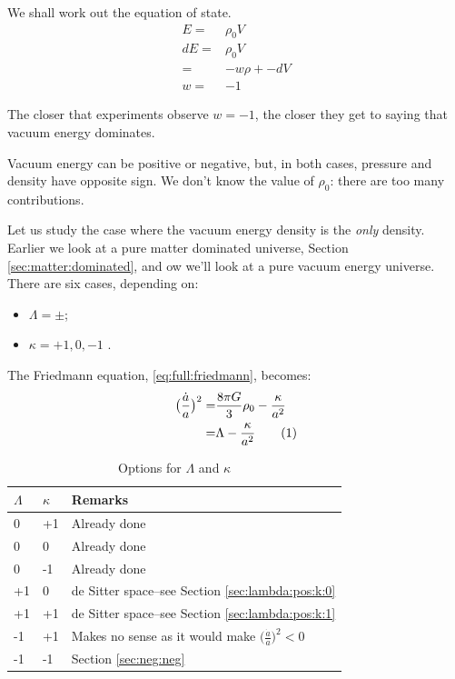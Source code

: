 \documentclass[]{article}
\newcommand\numberthis{\addtocounter{equation}{1}\tag{\theequation}}
\begin{document}
We shall work out the equation of state.
\begin{align*}
	E =& \rho_0V\\
	dE =& \rho_0 V \\
	=&-w \rho+- dV\\
	w=&-1
\end{align*}

The closer that experiments observe $w=-1$, the closer they get to saying that vacuum energy dominates.

Vacuum energy can be positive or negative, but, in both cases, pressure and density have opposite sign. We don't know the value of $\rho_0$: there are too many contributions.

Let us study the case where the vacuum energy density is the \emph{only} density. Earlier we look at a pure matter dominated universe, Section \ref{sec:matter:dominated}, and ow we'll look at a pure vacuum energy universe. There are six cases, depending on:
\begin{itemize}
	\item $\Lambda=\pm$;
	\item $\kappa= +1, 0, -1$ .
\end{itemize}

The Friedmann equation, \eqref{eq:full:friedmann}, becomes:
\begin{align*}
	\big(\frac{\dot{a}}{a}\big)^2  =& \frac{8\pi G}{3} \rho_0 - \frac{\kappa}{a^2}\\
	=& \Lambda - \frac{\kappa}{a^2} \numberthis \label{eq:friedmann:avec:lambda}
\end{align*}

\begin{table}[H]
	\begin{center}
		\caption{Options for $\Lambda$ and $\kappa$}
		\begin{tabular}{||l|l|p{5cm}||} \hline
			$\Lambda$ & $\kappa$ & Remarks\\ \hline
			0 & +1 & Already done\\\hline
			0 & 0 & Already done\\\hline
			0 & -1 & Already done\\\hline
			+1 & 0 &de Sitter space--see Section \ref{sec:lambda:pos:k:0}\\\hline
			+1 & +1 &de Sitter space--see Section \ref{sec:lambda:pos:k:1} \\\hline
			-1 & +1 & Makes no sense as it would make $\big(\frac{\dot{a}}{a}\big)^2<0$\\\hline
			-1&-1&Section \ref{sec:neg:neg} \\\hline
			\hline
		\end{tabular}
	\end{center}
\end{table}
\end{document}
